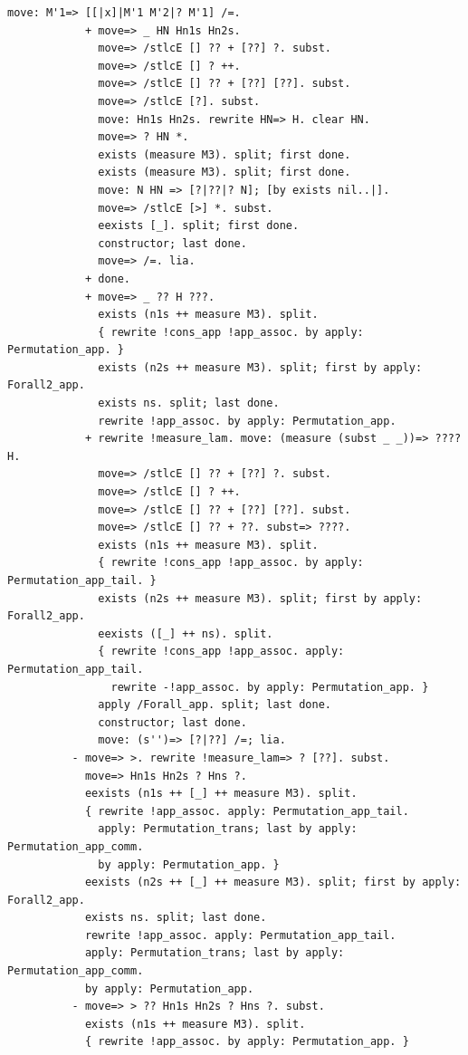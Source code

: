 \documentclass[10pt,a4paper]{article}
\begin{document}
\begin{lstlisting}[style=authorcoq]
            move: M'1=> [[|x]|M'1 M'2|? M'1] /=.
            + move=> _ HN Hn1s Hn2s.
              move=> /stlcE [] ?? + [??] ?. subst.
              move=> /stlcE [] ? ++.
              move=> /stlcE [] ?? + [??] [??]. subst.
              move=> /stlcE [?]. subst.
              move: Hn1s Hn2s. rewrite HN=> H. clear HN.
              move=> ? HN *.
              exists (measure M3). split; first done.
              exists (measure M3). split; first done.
              move: N HN => [?|??|? N]; [by exists nil..|].
              move=> /stlcE [>] *. subst.
              eexists [_]. split; first done.
              constructor; last done.
              move=> /=. lia.
            + done.
            + move=> _ ?? H ???.
              exists (n1s ++ measure M3). split.
              { rewrite !cons_app !app_assoc. by apply: Permutation_app. }
              exists (n2s ++ measure M3). split; first by apply: Forall2_app.
              exists ns. split; last done.
              rewrite !app_assoc. by apply: Permutation_app.
            + rewrite !measure_lam. move: (measure (subst _ _))=> ???? H.
              move=> /stlcE [] ?? + [??] ?. subst.
              move=> /stlcE [] ? ++.
              move=> /stlcE [] ?? + [??] [??]. subst.
              move=> /stlcE [] ?? + ??. subst=> ????.
              exists (n1s ++ measure M3). split.
              { rewrite !cons_app !app_assoc. by apply: Permutation_app_tail. }
              exists (n2s ++ measure M3). split; first by apply: Forall2_app.
              eexists ([_] ++ ns). split.
              { rewrite !cons_app !app_assoc. apply: Permutation_app_tail.
                rewrite -!app_assoc. by apply: Permutation_app. }
              apply /Forall_app. split; last done.
              constructor; last done.
              move: (s'')=> [?|??] /=; lia.
          - move=> >. rewrite !measure_lam=> ? [??]. subst.
            move=> Hn1s Hn2s ? Hns ?.
            eexists (n1s ++ [_] ++ measure M3). split.
            { rewrite !app_assoc. apply: Permutation_app_tail.
              apply: Permutation_trans; last by apply: Permutation_app_comm.
              by apply: Permutation_app. }
            eexists (n2s ++ [_] ++ measure M3). split; first by apply: Forall2_app.
            exists ns. split; last done.
            rewrite !app_assoc. apply: Permutation_app_tail.
            apply: Permutation_trans; last by apply: Permutation_app_comm.
            by apply: Permutation_app.
          - move=> > ?? Hn1s Hn2s ? Hns ?. subst.
            exists (n1s ++ measure M3). split.
            { rewrite !app_assoc. by apply: Permutation_app. }

\end{lstlisting}
\end{document}
